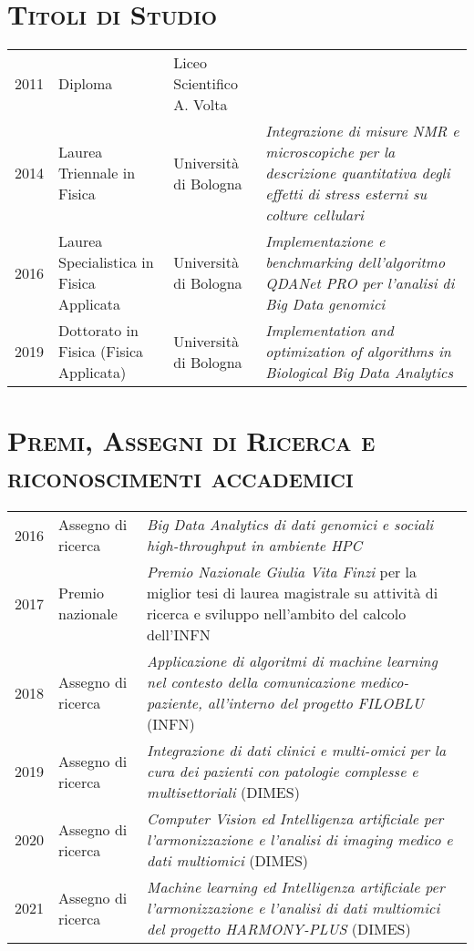 \documentclass[a4paper,11pt]{article}
\begin{document}
\newpage

\section*{\scshape{Titoli di Studio}}

\begin{tabular}{lp{4cm}lp{8cm}}
  2011 & Diploma                                  & Liceo Scientifico A. Volta & \\
  2014 & Laurea Triennale in Fisica               & Università di Bologna      & \emph{Integrazione di misure NMR e microscopiche per la descrizione quantitativa degli effetti di stress esterni su colture cellulari} \\
  2016 & Laurea Specialistica in Fisica Applicata & Università di Bologna      & \emph{Implementazione e benchmarking dell'algoritmo QDANet PRO per l'analisi di Big Data genomici} \\
  2019 & Dottorato in Fisica (Fisica Applicata)   & Università di Bologna      & \emph{Implementation and optimization of algorithms in Biological Big Data Analytics} \\
\end{tabular}



\vspace*{0.5cm}
\section*{\scshape{Premi, Assegni di Ricerca e riconoscimenti accademici}}

\begin{tabular}{llp{10cm}}

  2016 & Assegno di ricerca & \emph{Big Data Analytics di dati genomici e sociali high-throughput in ambiente HPC} \\
  2017 & Premio nazionale   & \emph{Premio Nazionale Giulia Vita Finzi} per la miglior tesi di laurea magistrale su attività di ricerca e sviluppo nell'ambito del calcolo dell'INFN\\
  2018 & Assegno di ricerca & \emph{Applicazione di algoritmi di machine learning nel contesto della comunicazione medico-paziente, all'interno del progetto FILOBLU} (INFN)\\
  2019 & Assegno di ricerca & \emph{Integrazione di dati clinici e multi-omici per la cura dei pazienti con patologie complesse e multisettoriali} (DIMES)\\
  2020 & Assegno di ricerca & \emph{Computer Vision ed Intelligenza artificiale per l'armonizzazione e l'analisi di imaging medico e dati multiomici} (DIMES)\\
  2021 & Assegno di ricerca & \emph{Machine learning ed Intelligenza artificiale per l'armonizzazione e l'analisi di dati multiomici del progetto HARMONY-PLUS} (DIMES)\\

\end{tabular}
\end{document}
